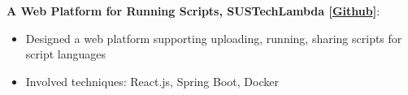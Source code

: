 \documentclass[letterpaper,11pt]{article}
\newcommand{\resumeItem}[2]{
  \item\small{
    \textbf{#1}{: #2 \vspace{-2pt}}
  }
}
\newcommand{\resumeSubItem}[2]{\resumeItem{#1}{#2}\vspace{-4pt}}
\begin{document}
   \resumeSubItem
      {A Web Platform for Running Scripts, SUSTechLambda [\href{https://github.com/Henrycobaltech/SUSTechLambda}{Github}]}{}
       \begin{itemize}
       \item Designed a web platform supporting uploading, running, sharing scripts for script languages
       \item Involved techniques: React.js, Spring Boot, Docker
       \end{itemize}
       
   
       
      
      
      
  
  
        
\end{document}
